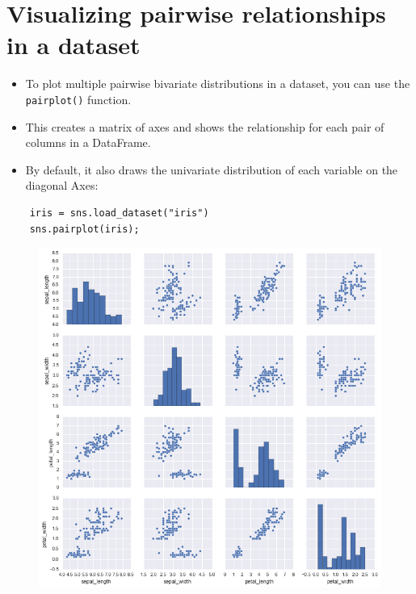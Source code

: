 \documentclass{beamer}
\begin{document}
\section{Visualizing pairwise relationships in a dataset}
\begin{frame}[fragile]
	\Large
	\begin{itemize}
		\item To plot multiple pairwise bivariate distributions in a dataset, you can use the \texttt{pairplot()} function.
		\item  This creates a matrix of axes and shows the relationship for each pair of columns in a DataFrame. 
		\item By default, it also draws the univariate distribution of each variable on the diagonal Axes:
	\end{itemize}
	\begin{verbatim}
	iris = sns.load_dataset("iris")
	sns.pairplot(iris);
	\end{verbatim}
\end{frame}
\begin{frame}
	\begin{figure}
		\centering
		\includegraphics[width=0.8\linewidth]{images/distributions_42_0}
		\caption{}
		\label{fig:distributions_42_0}
	\end{figure}
	
\end{frame}
\end{document}
